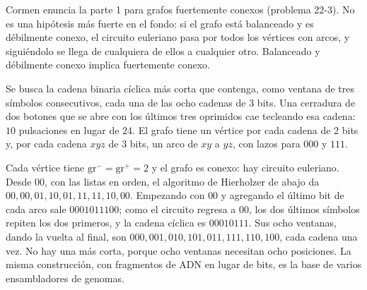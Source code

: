\documentclass[11pt,letterpaper]{article}
\begin{document}
Cormen enuncia la parte 1 para grafos fuertemente conexos
(problema 22-3). No es una hipótesis más fuerte en el fondo: si el
grafo está balanceado y es débilmente conexo, el circuito euleriano
pasa por todos los vértices con arcos, y siguiéndolo se llega de
cualquiera de ellos a cualquier otro. Balanceado y débilmente conexo
implica fuertemente conexo.

\begin{ejemplo}
  \label{ej:de-bruijn}
  Se busca la cadena binaria cíclica más corta que contenga, como
  ventana de tres símbolos consecutivos, cada una de las ocho cadenas
  de 3 bits. Una cerradura de dos botones que se abre con los últimos
  tres oprimidos cae tecleando esa cadena: $10$ pulsaciones en lugar
  de $24$. El grafo tiene un vértice por
  cada cadena de 2 bits y, por cada cadena $xyz$ de 3 bits, un arco de
  $xy$ a $yz$, con lazos para $000$ y $111$.
  \begin{center}
  \end{center}
  Cada vértice tiene $\text{gr}^{-} = \text{gr}^{+} = 2$ y el grafo es
  conexo: hay circuito euleriano. Desde $00$, con las listas en orden,
  el algoritmo de Hierholzer de abajo da
  $00, 00, 01, 10, 01, 11, 11, 10, 00$. Empezando con $00$ y agregando
  el último bit de cada arco sale $0001011100$; como el circuito
  regresa a $00$, los dos últimos símbolos repiten los dos primeros, y
  la cadena cíclica es $00010111$. Sus ocho ventanas, dando la vuelta
  al final, son $000, 001, 010, 101, 011, 111, 110, 100$, cada cadena
  una vez. No hay una más corta, porque ocho ventanas necesitan ocho
  posiciones. La misma construcción, con fragmentos de ADN en lugar de
  bits, es la base de varios ensambladores de genomas.
\end{ejemplo}
\end{document}
